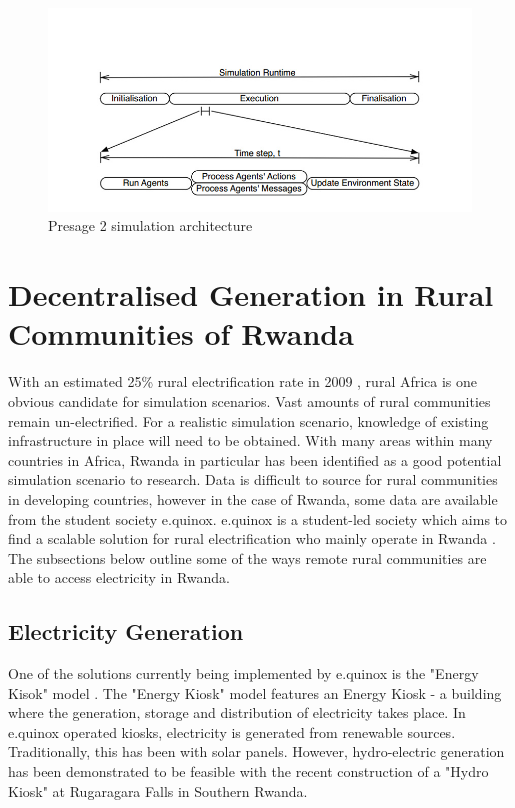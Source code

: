 \begin{figure}[h!]
	\centering
	\includegraphics[scale=0.4]{Images/Presage2.jpg}
	\caption{Presage 2 simulation architecture \cite{Presage_Kyoto:2015}}
	\label{fig:Presage_sim_architecture}
\end{figure}

\clearpage

\section*{Decentralised Generation in Rural Communities of Rwanda}
With an estimated 25\% rural electrification rate in 2009 \cite{IEA-web:2015}, rural Africa is one obvious candidate for simulation scenarios. Vast amounts of rural communities remain un-electrified. For a realistic simulation scenario, knowledge of existing infrastructure in place will need to be obtained. With many areas within many countries in Africa, Rwanda in particular has been identified as a good potential simulation scenario to research. Data is difficult to source for rural communities in developing countries, however in the case of Rwanda, some data are available from the student society e.quinox. e.quinox is a student-led society which aims to find a scalable solution for rural electrification who mainly operate in Rwanda \cite{e.quinox-web:2015}. The subsections below outline some of the ways remote rural communities are able to access electricity in Rwanda.

\subsection*{Electricity Generation}
One of the solutions currently being implemented by e.quinox is the "Energy Kisok" model \cite{e.quinox-EK-web:2015}. The "Energy Kiosk" model features an Energy Kiosk - a building where the generation, storage and distribution of electricity takes place.
In e.quinox operated kiosks, electricity is generated from renewable sources.
Traditionally, this has been with solar panels. However, hydro-electric generation has been demonstrated to be feasible with the recent construction of a "Hydro Kiosk" at Rugaragara Falls in Southern Rwanda.

